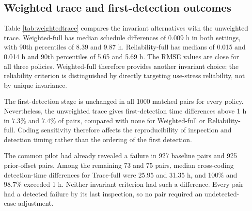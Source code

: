 \documentclass[a4paper,fleqn]{cas-sc}
\begin{document}
\begin{table}[t]
\centering
\caption{Paired RMSE reductions across equivalent codings. Positive values indicate lower RMSE at the larger scale.}
\label{tab:codingreduction}
\scriptsize\setlength{\tabcolsep}{2pt}
\end{table}

\subsection{Weighted trace and first-detection outcomes}

Table \ref{tab:weightedtrace} compares the invariant alternatives with the unweighted trace. Weighted-full has median schedule differences of 0.009 h in both settings, with 90th percentiles of 8.39 and 9.87 h. Reliability-full has medians of 0.015 and 0.014 h and 90th percentiles of 5.65 and 5.69 h. The RMSE values are close for all three policies. Weighted-full therefore provides another invariant choice; the reliability criterion is distinguished by directly targeting use-stress reliability, not by unique invariance.

The first-detection stage is unchanged in all 1000 matched pairs for every policy. Nevertheless, the unweighted trace gives first-detection time differences above 1 h in 7.3\% and 7.4\% of pairs, compared with none for Weighted-full or Reliability-full. Coding sensitivity therefore affects the reproducibility of inspection and detection timing rather than the ordering of the first detection.

The common pilot had already revealed a failure in 927 baseline pairs and 925 prior-offset pairs. Among the remaining 73 and 75 pairs, median cross-coding detection-time differences for Trace-full were 25.95 and 31.35 h, and 100\% and 98.7\% exceeded 1 h. Neither invariant criterion had such a difference. Every pair had a detected failure by its last inspection, so no pair required an undetected-case adjustment.

\begin{table}[t]
\centering
\caption{Weighted-trace and operational comparisons between stress scales 1 and 10. Schedule $\Delta t$ is the maximum absolute difference among inspection times. Detection $\Delta t$ is the absolute difference in first-detection time. The detection-stage index is unchanged in all matched pairs.}
\label{tab:weightedtrace}
\resizebox{\textwidth}{!}{}
\end{table}
\end{document}
